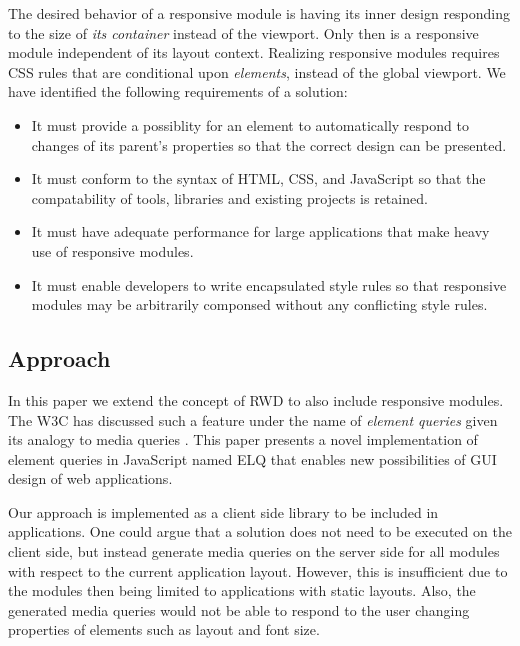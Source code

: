 \documentclass{acm_proc_article-sp}
\newcommand{\elq}{ELQ}
\begin{document}
      The desired behavior of a responsive module is having its inner design responding to the size of \emph{its container} instead of the viewport.
      Only then is a responsive module independent of its layout context.
      Realizing responsive modules requires CSS rules that are conditional upon \emph{elements}, instead of the global viewport.
      We have identified the following requirements of a solution:

      \begin{itemize}
        \item 
          It must provide a possiblity for an element to automatically respond to changes of its parent's properties so that the correct design can be presented.
        \item
          It must conform to the syntax of HTML, CSS, and JavaScript so that the compatability of tools, libraries and existing projects is retained.
        \item
          It must have adequate performance for large applications that make heavy use of responsive modules.
        \item
          It must enable developers to write encapsulated style rules so that responsive modules may be arbitrarily componsed without any conflicting style rules.
      \end{itemize}

    \subsection{Approach}
      In this paper we extend the concept of RWD to also include responsive modules.
      The W3C has discussed such a feature under the name of \emph{element queries} given its analogy to media queries \cite{w3c_eq_mail}.
      This paper presents a novel implementation of element queries in JavaScript named \elq{} that enables new possibilities of GUI design of web applications.

      Our approach is implemented as a client side library to be included in applications.
      One could argue that a solution does not need to be executed on the client side, but instead generate media queries on the server side for all modules with respect to the current application layout.
      However, this is insufficient due to the modules then being limited to applications with static layouts.
      Also, the generated media queries would not be able to respond to the user changing properties of elements such as layout and font size.
\end{document}
